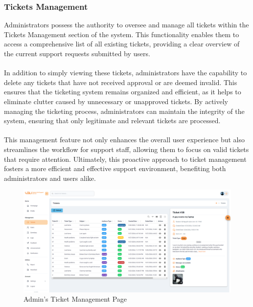 	\subsubsection{Tickets Management}
	Administrators possess the authority to oversee and manage all tickets within the Tickets Management section of the system. This functionality enables them to access a comprehensive list of all existing tickets, providing a clear overview of the current support requests submitted by users. \\ \\
	In addition to simply viewing these tickets, administrators have the capability to delete any tickets that have not received approval or are deemed invalid. This ensures that the ticketing system remains organized and efficient, as it helps to eliminate clutter caused by unnecessary or unapproved tickets. By actively managing the ticketing process, administrators can maintain the integrity of the system, ensuring that only legitimate and relevant tickets are processed. \\ \\ 
	This management feature not only enhances the overall user experience but also streamlines the workflow for support staff, allowing them to focus on valid tickets that require attention. Ultimately, this proactive approach to ticket management fosters a more efficient and effective support environment, benefiting both administrators and users alike.
	\begin{figure}[H]
		\centering
		\includegraphics[width=1\linewidth]{graphics/gui/admin/ticket-mng}
		\caption{Admin's Ticket Management Page}
		\label{fig:gui-ad-ticket-mng}
	\end{figure}
	
	
